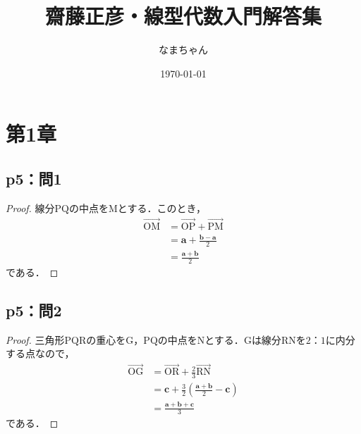 \documentclass[uplatex,dvipdfmx,a4paper,10pt,fleqn]{jsarticle}
\begin{document}
\title{齋藤正彦・線型代数入門解答集}
\author{なまちゃん}
\date{\today}
\maketitle
\begin{multicols*}{3}
    \tableofcontents
\end{multicols*}
\newpage
\section*{第1章}

\subsection*{p5：問1}

\begin{tleftbar}
    \begin{proof}
		線分$\mathrm{PQ}$の中点を$\mathrm{M}$とする．このとき，
		\begin{align*}
		\overrightarrow{\mathrm{OM}} & = \overrightarrow{\mathrm{OP}} + \overrightarrow{\mathrm{PM}} \\
		& = \bm{a} + \frac{\bm{b}-\bm{a}}{2} \\
		& = \frac{\bm{a}+\bm{b}}{2}
		\end{align*}
		である．
	\end{proof}
\end{tleftbar}
\subsection*{p5：問2}
\begin{tleftbar}
	\begin{proof}
		三角形$\mathrm{PQR}$の重心を$\mathrm{G}$，$\mathrm{PQ}$の中点を$\mathrm{N}$とする．$\mathrm{G}$は線分$\mathrm{RN}$を$2：1$に内分する点なので，
		\begin{align*}
			\overrightarrow{\mathrm{OG}} &= \overrightarrow{\mathrm{OR}} + \frac{2}{3} \overrightarrow{\mathrm{RN}} \\
			& = \bm{c}+ \frac{3}{2} \left (\frac{\bm{a}+\bm{b}}{2}-\bm{c} \right) \\
			& = \frac{\bm{a}+\bm{b}+\bm{c}}{3}
		\end{align*}
		である．
	\end{proof}
\end{tleftbar}
\end{document}
